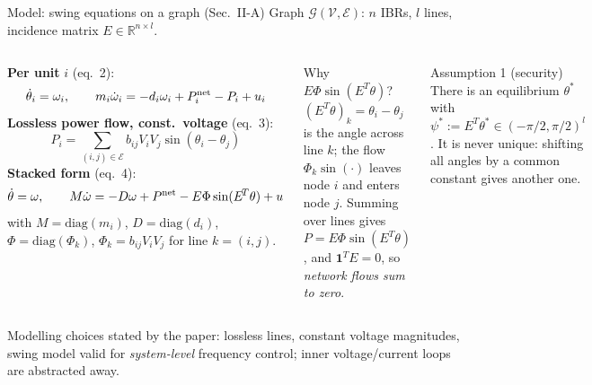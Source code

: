 \documentclass[aspectratio=169,9pt]{beamer}
\newcommand{\ones}{\mathbf{1}}
\begin{document}
\begin{frame}[t]{Model: swing equations on a graph (Sec.~II-A)}
\footnotesize
Graph $\mathcal G(\mathcal V,\mathcal E)$: $n$ IBRs, $l$ lines, incidence matrix $E\in\mathbb R^{n\times l}$.
\begin{columns}[T]
\textbf{Per unit} $i$ (eq.~2):
\[\dot\theta_i=\omega_i,\qquad m_i\dot\omega_i=-d_i\omega_i+P^{\rm net}_i-P_i+u_i\]
\textbf{Lossless power flow, const.\ voltage} (eq.~3):
\[P_i=\sum_{(i,j)\in\mathcal E} b_{ij}V_iV_j\sin(\theta_i-\theta_j)\]
\textbf{Stacked form} (eq.~4):
\[\dot\theta=\omega,\qquad M\dot\omega=-D\omega+P^{\rm net}-E\Phi\sin(E^{\!T}\theta)+u\]
with $M{=}\mathrm{diag}(m_i)$, $D{=}\mathrm{diag}(d_i)$, $\Phi{=}\mathrm{diag}(\Phi_k)$, $\Phi_k=b_{ij}V_iV_j$ for line $k=(i,j)$.
\begin{block}{Why $E\Phi\sin(E^T\theta)$?}
$(E^T\theta)_k=\theta_i-\theta_j$ is the angle across line $k$; the flow $\Phi_k\sin(\cdot)$ leaves node $i$ and enters node $j$. Summing over lines gives $P=E\Phi\sin(E^T\theta)$, and $\ones^TE=0$, so \emph{network flows sum to zero}.
\end{block}
\begin{alertblock}{Assumption 1 (security)}
There is an equilibrium $\theta^*$ with $\psi^*:=E^T\theta^*\in(-\pi/2,\pi/2)^l$. It is never unique: shifting all angles by a common constant gives another one.
\end{alertblock}
\end{columns}
\vspace{0.1cm}
{\scriptsize Modelling choices stated by the paper: lossless lines, constant voltage magnitudes, swing model valid for \emph{system-level} frequency control; inner voltage/current loops are abstracted away.}
\end{frame}
\end{document}
